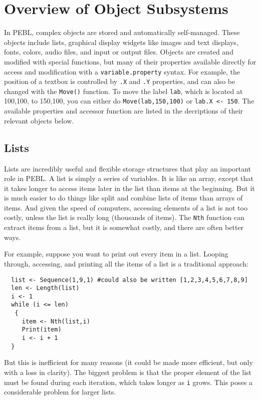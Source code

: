 \chapter
{Overview  of  Object Subsystems}

In PEBL, complex objects are stored and automatically self-managed.
These objects include lists, graphical display widgets like images and
text displays, fonts, colors, audio files, and input or output files.
Objects are created and modified with special functions, but many of
their properties available directly for access and modification with a
\texttt{variable.property} syntax.  For example, the position of a
textbox is controlled by \verb+.X+ and \verb+.Y+ properties, and can
also be changed with the \verb+Move()+ function.  To move the label
\texttt{lab}, which is located at 100,100, to 150,100, you can either
do \texttt{Move(lab,150,100)} or \verb+lab.X <- 150+.  The available
properties and accessor function are listed in the decriptions of
their relevant objects below.


\section{Lists}

Lists are  incredibly useful and flexible storage
structures that play an important role in PEBL. A list is
simply a series of variables. It is  like an array, except
that it takes longer to access items later in the
list than items at the beginning. But it is much easier to
do things like split and combine lists of items than arrays of items. And given the speed of 
computers, accessing elements of a list is not too costly,
unless the list is really long (thousands of items). The \texttt{Nth} function can extract items from a list, but it is somewhat costly, and there are often better ways.


For example, suppose you want to print out every item in a list. Looping through, accessing, and printing all the items of a list is a traditional approach:
\begin{verbatim}
  list <- Sequence(1,9,1) #could also be written [1,2,3,4,5,6,7,8,9]
  len <- Length(list)
  i <- 1
  while (i <= len)
   {
     item <- Nth(list,i) 
     Print(item)
     i <- i + 1
  } 

\end{verbatim}
But this is inefficient for many reasons (it could be made more
efficient, but only with a loss in clarity). The biggest problem is
that the proper element of the list must be found during each
iteration, which takes longer as \texttt{i} grows. This poses a
considerable problem for larger lists.

